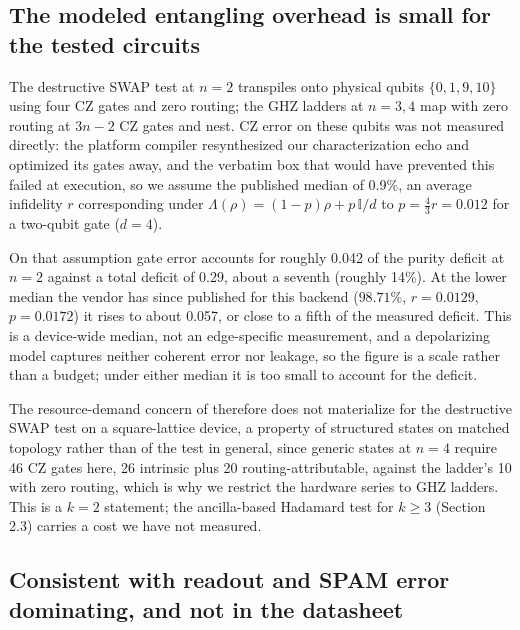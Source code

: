 \hypertarget{the-entangling-overhead-is-nearly-free}{%
\subsection{The modeled entangling overhead is small for the tested circuits}\label{the-entangling-overhead-is-nearly-free}}

The destructive SWAP test at \(n = 2\) transpiles onto physical qubits
\(\{0, 1, 9, 10\}\) using four CZ gates and zero routing; the GHZ ladders
at \(n = 3, 4\) map with zero routing at \(3n - 2\) CZ gates and nest. CZ
error on these qubits was not measured directly: the platform compiler
resynthesized our characterization echo and optimized its gates away, and
the verbatim box that would have prevented this failed at execution, so
we assume the published median of 0.9\%, an average infidelity \(r\)
corresponding under \(\Lambda(\rho) = (1-p)\rho + p\,\mathbb{I}/d\) to
\(p = \tfrac{4}{3} r = 0.012\) for a two-qubit gate (\(d = 4\)).

On that assumption gate error accounts for roughly 0.042 of the purity
deficit at \(n = 2\) against a total deficit of 0.29, about a seventh
(roughly 14\%). At the lower median the vendor has since published for
this backend (\(98.71\%\), \(r = 0.0129\), \(p = 0.0172\)) it rises to
about 0.057, or close to a fifth of the measured deficit. This is a
device-wide median, not an edge-specific measurement, and a depolarizing
model captures neither coherent error nor leakage, so the figure is a
scale rather than a budget; under either median it is too small to account
for the deficit.

The resource-demand concern of \cite{qmladvantage2026} therefore does not
materialize for the destructive SWAP test on a square-lattice device, a
property of structured states on matched topology rather than of the test
in general, since generic states at \(n = 4\) require 46 CZ gates here, 26
intrinsic plus 20 routing-attributable, against the ladder's 10 with zero
routing, which is why we restrict the hardware series to GHZ ladders. This
is a \(k = 2\) statement; the ancilla-based Hadamard test for \(k \geq 3\)
(Section 2.3) carries a cost we have not measured.

\hypertarget{readout-is-the-wall-and-it-is-not-in-the-datasheet}{%
\subsection{Consistent with readout and SPAM error dominating, and not in the datasheet}\label{readout-is-the-wall-and-it-is-not-in-the-datasheet}}

